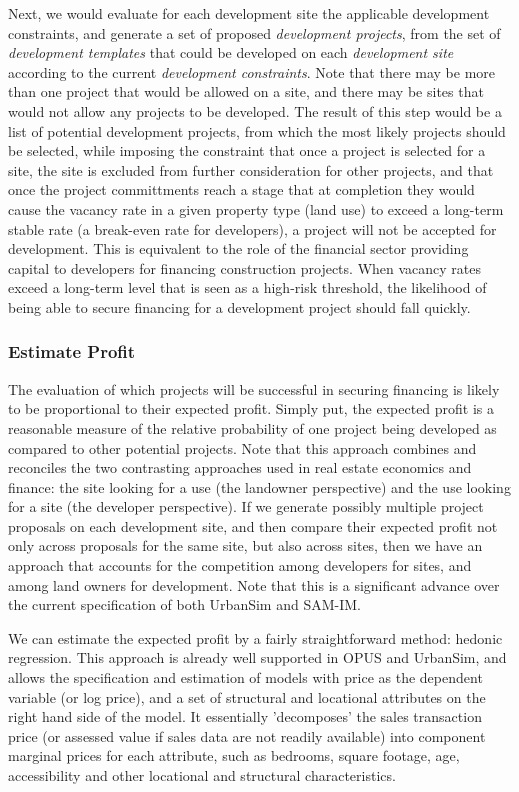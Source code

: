 Next, we would evaluate for each development site the applicable development constraints, and
generate a set of proposed \emph{development projects}, from the set of \emph{development templates}
that could be developed on each \emph{development site} according to the current \emph{development
constraints}.  Note that there may be more than one project that would be allowed on a site, and 
there may be sites that would not allow any projects to be developed.  The result of this step
would be a list of potential development projects, from which the most likely projects should be
selected, while imposing the constraint that once a project is selected for a site, the site is
excluded from further consideration for other projects, and that once the project committments
reach a stage that at completion they would cause the vacancy rate in a given property type (land
use) to exceed a long-term stable rate (a break-even rate for developers), a project will not be
accepted for development.  This is equivalent to the role of the financial sector providing
capital to developers for financing construction projects. When vacancy rates exceed a long-term
level that is seen as a high-risk threshold, the likelihood of being able to secure financing for
a development project should fall quickly.

\subsubsection{Estimate Profit}
The evaluation of which projects will be successful in securing financing is likely to be proportional
to their expected profit.  Simply put, the expected profit is a reasonable measure of the relative
probability of one project being developed as compared to other potential projects.  Note that this
approach combines and reconciles the two contrasting approaches used in real estate economics and
finance: the site looking for a use (the landowner perspective) and the use looking for a site (the developer perspective).  If we generate possibly multiple project proposals on each development site,
and then compare their expected profit not only across proposals for the same site, but also across
sites, then we have an approach that accounts for the competition among developers for sites, and
among land owners for development.  Note that this is a significant advance over the current
specification of both UrbanSim and SAM-IM.

We can estimate the expected profit by a fairly straightforward method: hedonic regression.  This
approach is already well supported in OPUS and UrbanSim, and allows the specification and estimation
of models with price as the dependent variable (or log price), and a set of structural and locational
attributes on the right hand side of the model.  It essentially 'decomposes' the sales transaction
price (or assessed value if sales data are not readily available) into component marginal prices for
each attribute, such as bedrooms, square footage, age, accessibility and other locational 
and structural characteristics.

